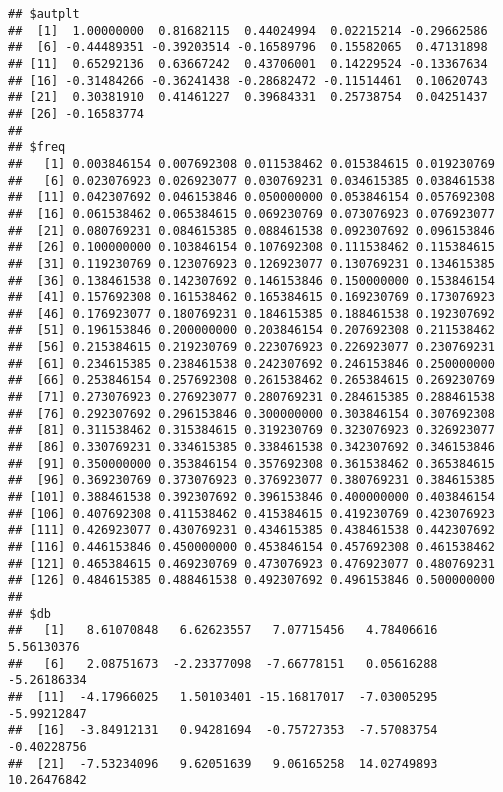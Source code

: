 \documentclass[]{article}
\begin{document}
\begin{verbatim}
## $autplt
##  [1]  1.00000000  0.81682115  0.44024994  0.02215214 -0.29662586
##  [6] -0.44489351 -0.39203514 -0.16589796  0.15582065  0.47131898
## [11]  0.65292136  0.63667242  0.43706001  0.14229524 -0.13367634
## [16] -0.31484266 -0.36241438 -0.28682472 -0.11514461  0.10620743
## [21]  0.30381910  0.41461227  0.39684331  0.25738754  0.04251437
## [26] -0.16583774
## 
## $freq
##   [1] 0.003846154 0.007692308 0.011538462 0.015384615 0.019230769
##   [6] 0.023076923 0.026923077 0.030769231 0.034615385 0.038461538
##  [11] 0.042307692 0.046153846 0.050000000 0.053846154 0.057692308
##  [16] 0.061538462 0.065384615 0.069230769 0.073076923 0.076923077
##  [21] 0.080769231 0.084615385 0.088461538 0.092307692 0.096153846
##  [26] 0.100000000 0.103846154 0.107692308 0.111538462 0.115384615
##  [31] 0.119230769 0.123076923 0.126923077 0.130769231 0.134615385
##  [36] 0.138461538 0.142307692 0.146153846 0.150000000 0.153846154
##  [41] 0.157692308 0.161538462 0.165384615 0.169230769 0.173076923
##  [46] 0.176923077 0.180769231 0.184615385 0.188461538 0.192307692
##  [51] 0.196153846 0.200000000 0.203846154 0.207692308 0.211538462
##  [56] 0.215384615 0.219230769 0.223076923 0.226923077 0.230769231
##  [61] 0.234615385 0.238461538 0.242307692 0.246153846 0.250000000
##  [66] 0.253846154 0.257692308 0.261538462 0.265384615 0.269230769
##  [71] 0.273076923 0.276923077 0.280769231 0.284615385 0.288461538
##  [76] 0.292307692 0.296153846 0.300000000 0.303846154 0.307692308
##  [81] 0.311538462 0.315384615 0.319230769 0.323076923 0.326923077
##  [86] 0.330769231 0.334615385 0.338461538 0.342307692 0.346153846
##  [91] 0.350000000 0.353846154 0.357692308 0.361538462 0.365384615
##  [96] 0.369230769 0.373076923 0.376923077 0.380769231 0.384615385
## [101] 0.388461538 0.392307692 0.396153846 0.400000000 0.403846154
## [106] 0.407692308 0.411538462 0.415384615 0.419230769 0.423076923
## [111] 0.426923077 0.430769231 0.434615385 0.438461538 0.442307692
## [116] 0.446153846 0.450000000 0.453846154 0.457692308 0.461538462
## [121] 0.465384615 0.469230769 0.473076923 0.476923077 0.480769231
## [126] 0.484615385 0.488461538 0.492307692 0.496153846 0.500000000
## 
## $db
##   [1]   8.61070848   6.62623557   7.07715456   4.78406616   5.56130376
##   [6]   2.08751673  -2.23377098  -7.66778151   0.05616288  -5.26186334
##  [11]  -4.17966025   1.50103401 -15.16817017  -7.03005295  -5.99212847
##  [16]  -3.84912131   0.94281694  -0.75727353  -7.57083754  -0.40228756
##  [21]  -7.53234096   9.62051639   9.06165258  14.02749893  10.26476842

\end{verbatim}
\end{document}
